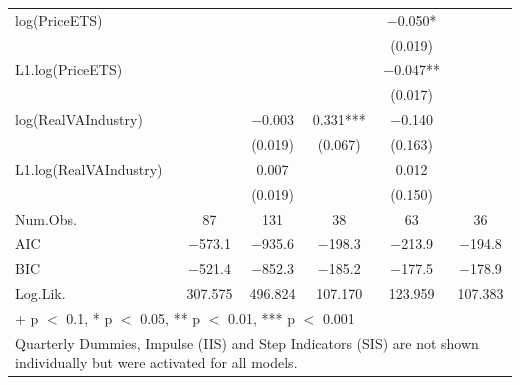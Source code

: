 \begin{table}
{\begin{tabular}[t]{lccccc}
log(PriceETS) &  &  &  & \num{-0.050}* & \\
 &  &  &  & (\num{0.019}) & \\
L1.log(PriceETS) &  &  &  & \num{-0.047}** & \\
 &  &  &  & (\num{0.017}) & \\
log(RealVAIndustry) &  & \num{-0.003} & \num{0.331}*** & \num{-0.140} & \\
 &  & (\num{0.019}) & (\num{0.067}) & (\num{0.163}) & \\
L1.log(RealVAIndustry) &  & \num{0.007} &  & \num{0.012} & \\
 &  & (\num{0.019}) &  & (\num{0.150}) & \\
\midrule
Num.Obs. & \num{87} & \num{131} & \num{38} & \num{63} & \num{36}\\
AIC & \num{-573.1} & \num{-935.6} & \num{-198.3} & \num{-213.9} & \num{-194.8}\\
BIC & \num{-521.4} & \num{-852.3} & \num{-185.2} & \num{-177.5} & \num{-178.9}\\
Log.Lik. & \num{307.575} & \num{496.824} & \num{107.170} & \num{123.959} & \num{107.383}\\
\bottomrule
\multicolumn{6}{l}{\rule{0pt}{1em}+ p $<$ 0.1, * p $<$ 0.05, ** p $<$ 0.01, *** p $<$ 0.001}\\
\multicolumn{6}{l}{\rule{0pt}{1em}Quarterly Dummies, Impulse (IIS) and Step Indicators (SIS) are not shown individually but were activated for all models.}\\
\end{tabular}}
\end{table}

